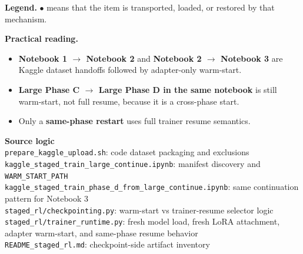 \documentclass[11pt]{article}
\newcommand{\code}[1]{\texttt{#1}}
\begin{document}
\noindent\textbf{Legend.}
\textcolor{YesGreen}{\Large$\bullet$} means that the item is transported, loaded, or restored by that mechanism.

\vspace{0.35em}
\noindent\textbf{Practical reading.}
\begin{itemize}
\item \textbf{Notebook 1 $\rightarrow$ Notebook 2} and \textbf{Notebook 2 $\rightarrow$ Notebook 3} are Kaggle dataset handoffs followed by adapter-only warm-start.
\item \textbf{Large Phase C $\rightarrow$ Large Phase D in the same notebook} is still warm-start, not full resume, because it is a cross-phase start.
\item Only a \textbf{same-phase restart} uses full trainer resume semantics.
\end{itemize}

\vspace{0.35em}
\noindent\textbf{Source logic}\\
\code{prepare\_kaggle\_upload.sh}: code dataset packaging and exclusions\\
\code{kaggle\_staged\_train\_large\_continue.ipynb}: manifest discovery and \code{WARM\_START\_PATH}\\
\code{kaggle\_staged\_train\_phase\_d\_from\_large\_continue.ipynb}: same continuation pattern for Notebook 3\\
\code{staged\_rl/checkpointing.py}: warm-start vs trainer-resume selector logic\\
\code{staged\_rl/trainer\_runtime.py}: fresh model load, fresh LoRA attachment, adapter warm-start, and same-phase resume behavior\\
\code{README\_staged\_rl.md}: checkpoint-side artifact inventory
\end{document}
